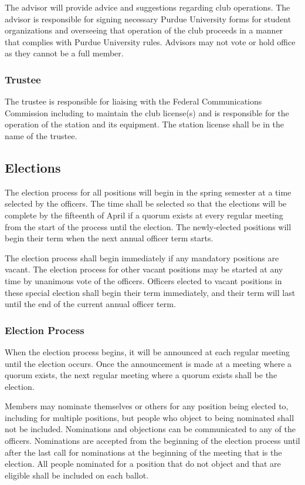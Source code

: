 \documentclass{article}
\begin{document}
The advisor will provide advice and suggestions regarding club operations. The
advisor is responsible for signing necessary Purdue University forms for student
organizations and overseeing that operation of the club proceeds in a manner
that complies with Purdue University rules. Advisors may not vote or hold
office as they cannot be a full member.

\subsubsection{Trustee}

The trustee is responsible for liaising with the Federal Communications
Commission including to maintain the club license(s) and is responsible for the
operation of the station and its equipment. The station license shall be in the
name of the trustee.

\subsection{Elections}

The election process for all positions will begin in the spring semester at a
time selected by the officers. The time shall be selected so that the elections
will be complete by the fifteenth of April if a quorum exists at every regular
meeting from the start of the process until the election. The newly-elected
positions will begin their term when the next annual officer term starts.

The election process shall begin immediately if any mandatory positions are
vacant. The election process for other vacant positions may be started at any
time by unanimous vote of the officers. Officers elected to vacant positions in
these special election shall begin their term immediately, and their term will
last until the end of the current annual officer term.

\subsubsection{Election Process}

When the election process begins, it will be announced at each regular meeting
until the election occurs. Once the announcement is made at a meeting where a
quorum exists, the next regular meeting where a quorum exists shall be the
election.

Members may nominate themselves or others for any position being elected to,
including for multiple positions, but people who object to being nominated shall
not be included. Nominations and objections can be communicated to any of the
officers. Nominations are accepted from the beginning of the election process
until after the last call for nominations at the beginning of the meeting that
is the election. All people nominated for a position that do not object and that
are eligible shall be included on each ballot.
\end{document}
